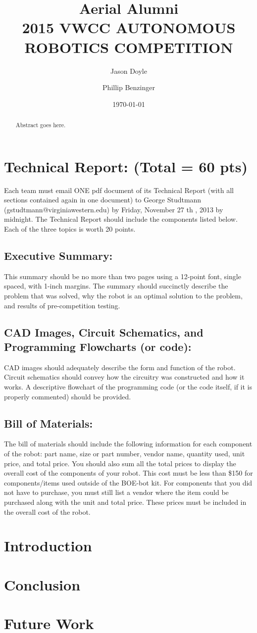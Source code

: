 \documentclass{article}
\title{ Aerial Alumni \\ 2015  VWCC AUTONOMOUS ROBOTICS COMPETITION }
\author{ Jason Doyle \and Phillip Benzinger }
\date{ \today }
\begin{document}
\maketitle

\begin{abstract}
Abstract goes here.
\end{abstract}
\clearpage

\tableofcontents
\listoffigures
\clearpage

\section{ Technical Report: (Total = 60 pts) }
Each team must email ONE pdf document of its Technical Report (with all sections contained again in
one document) to George Studtmann (gstudtmann@virginiawestern.edu) by Friday, November 27 th ,
2013 by midnight. The Technical Report should include the components listed below. Each of the three
topics is worth 20 points.
\subsection{ Executive Summary: }
This summary should be no more than two pages using a 12-point font, single spaced, with 1-inch
margins. The summary should succinctly describe the problem that was solved, why the robot is an optimal
solution to the problem, and results of pre-competition testing.
\subsection{ CAD Images, Circuit Schematics, and Programming Flowcharts (or code): }
CAD images should adequately describe the form and function of the robot. Circuit schematics should
convey how the circuitry was constructed and how it works. A descriptive flowchart of the programming
code (or the code itself, if it is properly commented) should be provided.
\subsection{ Bill of Materials: }
The bill of materials should include the following information for each component of the robot: part
name, size or part number, vendor name, quantity used, unit price, and total price. You should also sum all
the total prices to display the overall cost of the components of your robot. This cost must be less than \$150
for components/items used outside of the BOE-bot kit. For components that you did not have to purchase,
you must still list a vendor where the item could be purchased along with the unit and total price. These
prices must be included in the overall cost of the robot.

\section{ Introduction }


\section{ Conclusion }


\section{ Future Work }
\end{document}
